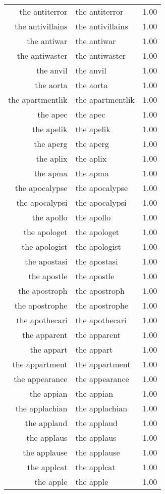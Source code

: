 \begin{table}[ht]
\begin{tabular}{rlr}
  the antiterror & the antiterror & 1.00 \\ 
  the antivillains & the antivillains & 1.00 \\ 
  the antiwar & the antiwar & 1.00 \\ 
  the antiwaster & the antiwaster & 1.00 \\ 
  the anvil & the anvil & 1.00 \\ 
  the aorta & the aorta & 1.00 \\ 
  the apartmentlik & the apartmentlik & 1.00 \\ 
  the apec & the apec & 1.00 \\ 
  the apelik & the apelik & 1.00 \\ 
  the aperg & the aperg & 1.00 \\ 
  the aplix & the aplix & 1.00 \\ 
  the apma & the apma & 1.00 \\ 
  the apocalypse & the apocalypse & 1.00 \\ 
  the apocalypsi & the apocalypsi & 1.00 \\ 
  the apollo & the apollo & 1.00 \\ 
  the apologet & the apologet & 1.00 \\ 
  the apologist & the apologist & 1.00 \\ 
  the apostasi & the apostasi & 1.00 \\ 
  the apostle & the apostle & 1.00 \\ 
  the apostroph & the apostroph & 1.00 \\ 
  the apostrophe & the apostrophe & 1.00 \\ 
  the apothecari & the apothecari & 1.00 \\ 
  the apparent & the apparent & 1.00 \\ 
  the appart & the appart & 1.00 \\ 
  the appartment & the appartment & 1.00 \\ 
  the appearance & the appearance & 1.00 \\ 
  the appian & the appian & 1.00 \\ 
  the applachian & the applachian & 1.00 \\ 
  the applaud & the applaud & 1.00 \\ 
  the applaus & the applaus & 1.00 \\ 
  the applause & the applause & 1.00 \\ 
  the applcat & the applcat & 1.00 \\ 
  the apple & the apple & 1.00 \\ 

\end{tabular}
\end{table}
